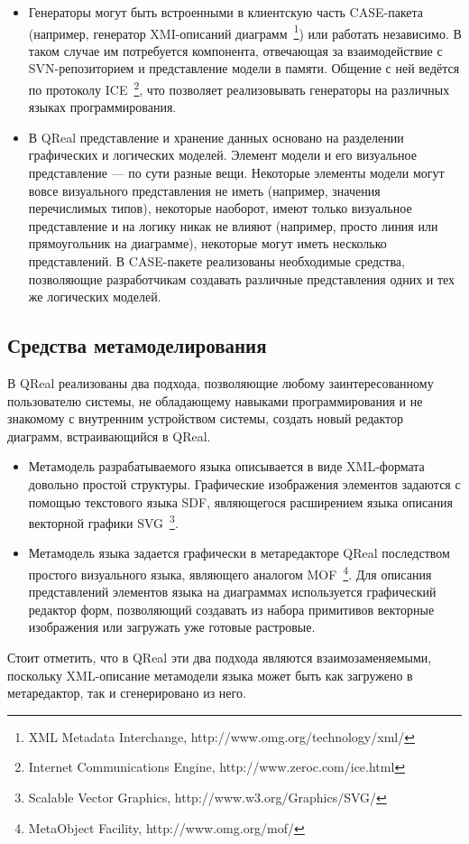\documentclass[a4paper]{article}
\begin{document}
\begin{itemize}
  \item Генераторы могут быть встроенными в клиентскую часть CASE-пакета (например, генератор XMI-описаний диаграмм~\footnote{XML Metadata Interchange, http://www.omg.org/technology/xml/}) или работать независимо. В таком случае им потребуется компонента, отвечающая за взаимодействие с SVN-репозиторием и представление модели в памяти. Общение с ней ведётся по протоколу ICE~\footnote{Internet Communications Engine, http://www.zeroc.com/ice.html}, что позволяет реализовывать генераторы на различных языках программирования.
  \item В QReal представление и хранение данных основано на разделении графических и логических моделей. Элемент модели и его визуальное представление --- по сути разные вещи. Некоторые элементы модели могут вовсе визуального представления не иметь (например, значения перечислимых типов), некоторые наоборот, имеют только визуальное представление и на логику никак не влияют (например, просто линия или прямоугольник на диаграмме), некоторые могут иметь несколько представлений. В CASE-пакете реализованы необходимые средства, позволяющие разработчикам создавать различные представления одних и тех же логических моделей.
\end{itemize}


\subsection{Средства метамоделирования}

В QReal реализованы два подхода, позволяющие любому заинтересованному пользователю системы, не обладающему навыками программирования и не знакомому с внутренним устройством системы, создать новый редактор диаграмм, встраивающийся в QReal.
\begin{itemize}
  \item Метамодель разрабатываемого языка описывается в виде XML-формата довольно простой структуры. Графические изображения элементов задаются с помощью текстового языка SDF, являющегося расширением языка описания векторной графики SVG~\footnote{Scalable Vector Graphics, http://www.w3.org/Graphics/SVG/}.
  \item Метамодель языка задается графически в метаредакторе QReal последством простого визуального языка, являющего аналогом MOF~\footnote{MetaObject Facility, http://www.omg.org/mof/}. Для описания представлений элементов языка на диаграммах используется графический редактор форм, позволяющий создавать из набора примитивов векторные изображения или загружать уже готовые растровые.
\end{itemize}
Стоит отметить, что в QReal эти два подхода являются взаимозаменяемыми, поскольку XML-описание метамодели языка может быть как загружено в метаредактор, так и сгенерировано из него. 
\end{document}
